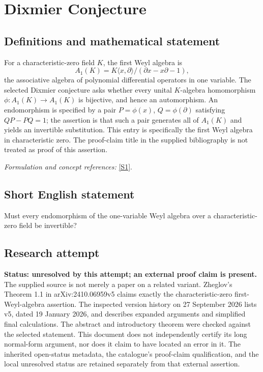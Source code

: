 \documentclass[11pt]{article}
\begin{document}
\section*{\texorpdfstring{Dixmier Conjecture}{Dixmier Conjecture}}\label{336}
\subsection{Definitions and mathematical statement}
For a characteristic-zero field $K$, the first Weyl algebra is
\[
 A_1(K)=K\langle x,\partial\rangle/(\partial x-x\partial-1),
\]
the associative algebra of polynomial differential operators in one variable. The selected Dixmier conjecture asks whether every unital $K$-algebra homomorphism $\phi:A_1(K)\to A_1(K)$ is bijective, and hence an automorphism. An endomorphism is specified by a pair $P=\phi(x)$, $Q=\phi(\partial)$ satisfying $QP-PQ=1$; the assertion is that such a pair generates all of $A_1(K)$ and yields an invertible substitution. This entry is specifically the first Weyl algebra in characteristic zero. The proof-claim title in the supplied bibliography is not treated as proof of this assertion.
\par\smallskip\textit{Formulation and concept references:} \href{https://arxiv.org/abs/2410.06959}{[S1]}.

\subsection{Short English statement}
Must every endomorphism of the one-variable Weyl algebra over a characteristic-zero field be invertible?
\subsection{Research attempt}
\textbf{Status: unresolved by this attempt; an external proof claim is present.} The supplied source is not merely a paper on a related variant. Zheglov's Theorem 1.1 in arXiv:2410.06959v5 claims exactly the characteristic-zero first-Weyl-algebra assertion. The inspected version history on 27 September 2026 lists v5, dated 19 January 2026, and describes expanded arguments and simplified final calculations. The abstract and introductory theorem were checked against the selected statement. This document does not independently certify its long normal-form argument, nor does it claim to have located an error in it. The inherited open-status metadata, the catalogue's proof-claim qualification, and the local unresolved status are retained separately from that external assertion.
\end{document}
